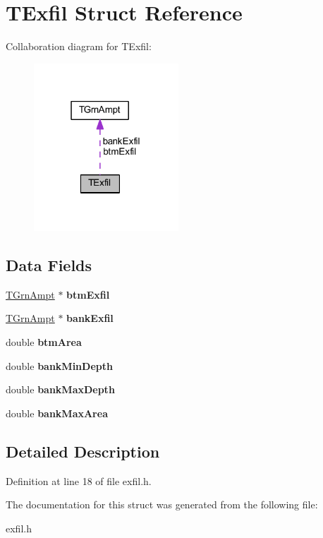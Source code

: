 \hypertarget{struct_t_exfil}{}\section{T\+Exfil Struct Reference}
\label{struct_t_exfil}


Collaboration diagram for T\+Exfil\+:
\nopagebreak
\begin{figure}[H]
\begin{center}
\leavevmode
\includegraphics[width=154pt]{d8/db9/struct_t_exfil__coll__graph}
\end{center}
\end{figure}
\subsection*{Data Fields}
\begin{DoxyCompactItemize}
\item 
\mbox{\label{struct_t_exfil_ae1d9d6519183ea71abab797a94c43d77}} 
\hyperlink{struct_t_grn_ampt}{T\+Grn\+Ampt} $\ast$ {\bfseries btm\+Exfil}
\item 
\mbox{\label{struct_t_exfil_a10c8fb997d6becc557247895af4f9a44}} 
\hyperlink{struct_t_grn_ampt}{T\+Grn\+Ampt} $\ast$ {\bfseries bank\+Exfil}
\item 
\mbox{\label{struct_t_exfil_aa1ad869158ff3344d0418e55afd9c56e}} 
double {\bfseries btm\+Area}
\item 
\mbox{\label{struct_t_exfil_a3aff930f651b2cdb942630eb11a21dca}} 
double {\bfseries bank\+Min\+Depth}
\item 
\mbox{\label{struct_t_exfil_a8bc309d0504643e689450e5383a2cbb6}} 
double {\bfseries bank\+Max\+Depth}
\item 
\mbox{\label{struct_t_exfil_afd919a1533bde1363bfa6eac5b32754f}} 
double {\bfseries bank\+Max\+Area}
\end{DoxyCompactItemize}


\subsection{Detailed Description}


Definition at line 18 of file exfil.\+h.



The documentation for this struct was generated from the following file\+:\begin{DoxyCompactItemize}
\item 
exfil.\+h\end{DoxyCompactItemize}
